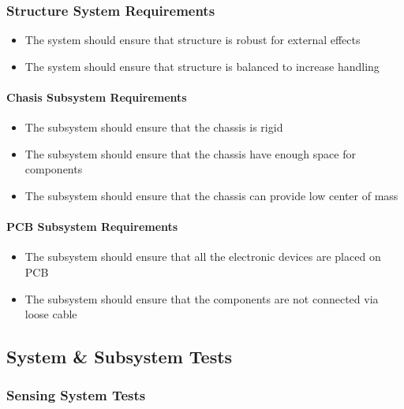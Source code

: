 \documentclass[a4paper,12pt]{article}
\begin{document}
	
	\subsubsection{Structure System Requirements}
	
		\begin{itemize}
			\item The system should	ensure that structure is robust for external effects 
			\item The system should	ensure that structure is balanced to increase handling
	
		\end{itemize}
	
	\paragraph{Chasis Subsystem Requirements}	
		
			\begin{itemize}
			\item The subsystem should ensure that the chassis is rigid 
			\item The subsystem should ensure that the chassis have enough space for components
			\item The subsystem should ensure that the chassis can provide low center of mass 

		\end{itemize}
		
	\paragraph{PCB Subsystem Requirements}
	
		\begin{itemize}
			\item The subsystem should ensure that all the electronic devices are placed on PCB
			\item The subsystem should ensure that the components are not connected via loose cable 	
		\end{itemize}	



	\subsection{System \& Subsystem Tests }
	

	\subsubsection{Sensing System Tests}
	
\end{document}
